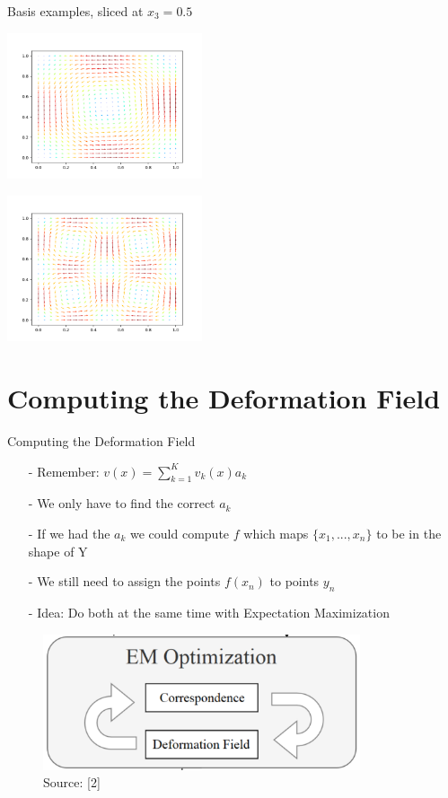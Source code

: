 \documentclass[xcolor=dvipsnames]{beamer}
\begin{document}
\begin{frame}{Basis examples, sliced at $x_3=0.5$}
\begin{minipage}{.5\textwidth}
  \centering
  \includegraphics[height=4.3cm]{Pictures/basis1.png}
  \label{fig:test1}
\end{minipage}%
\begin{minipage}{.5\textwidth}
  \centering
  \includegraphics[height=4.3cm]{Pictures/basis2.png}
  \label{fig:test2}
\end{minipage}
\end{frame}

\section{Computing the Deformation Field}
\begin{frame}{Computing the Deformation Field}
\begin{enumerate}
\item[-] Remember: $v(x) = \sum_{k=1}^K v_k(x)a_k$
\item[-] We only have to find the correct $a_k$
\pause
\item[-] If we had the $a_k$ we could compute $f$ which maps $\{x_1,...,x_n\}$ to be in the shape of Y
\item[-] We still need to assign the points $f(x_n)$ to points $y_n$
\item[-] Idea: Do both at the same time with Expectation Maximization
\pause
\end{enumerate}
\begin{figure}
\includegraphics[height=4cm]{Pictures/Pipeline.png}
\caption*{Source: [2]}
\end{figure}
\end{frame}
\end{document}
